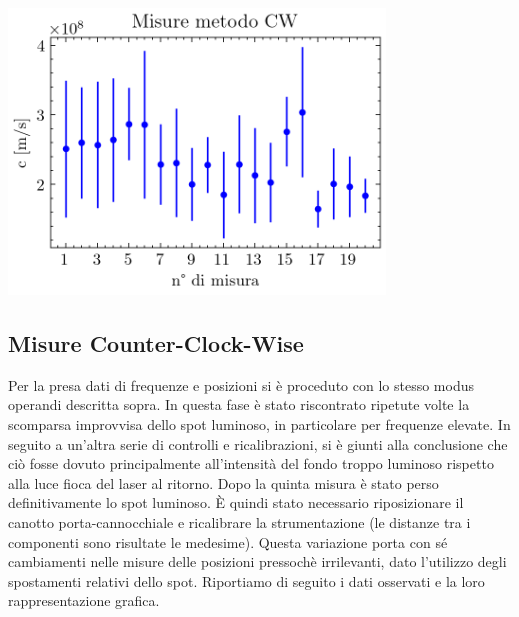 \documentclass{article}
\begin{document}
\begin{minipage}{\textwidth}
\begin{minipage}[b]{0.35\textwidth}
                \end{minipage}
                \begin{minipage}[b]{0.65\linewidth}  

                    \centering
                    \includegraphics[width=10cm]{../images/CW.png}

                    \label{fig:c_CW}

                \end{minipage}
            
            \end{minipage}
            
            
        \subsection{Misure Counter-Clock-Wise}

            Per la presa dati di frequenze e posizioni si è proceduto con lo stesso modus operandi descritta sopra. 
            In questa fase è stato riscontrato ripetute volte la scomparsa improvvisa dello spot luminoso, in particolare per frequenze elevate. 
            In seguito a un'altra serie di controlli e ricalibrazioni, si è giunti alla conclusione che ciò fosse dovuto principalmente all'intensità del fondo 
            troppo luminoso rispetto alla luce fioca del laser al ritorno. 
            Dopo la quinta misura è stato perso definitivamente lo spot luminoso. È quindi stato necessario riposizionare il canotto porta-cannocchiale e 
            ricalibrare la strumentazione (le distanze tra i componenti sono risultate le medesime).
            Questa variazione porta con sé cambiamenti nelle misure delle posizioni pressochè irrilevanti, dato l'utilizzo degli spostamenti relativi dello spot.
            Riportiamo di seguito i dati osservati e la loro rappresentazione grafica.   
\end{document}
